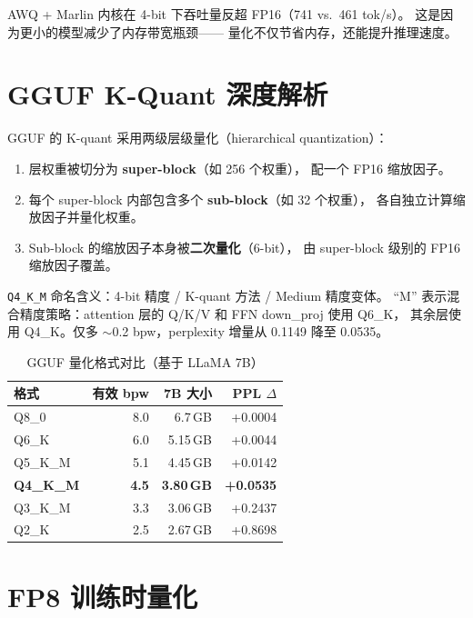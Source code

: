 \documentclass[
  customlatinfont = macos,
]{hkustthesis}
\begin{document}
AWQ + Marlin 内核在 4-bit 下吞吐量反超 FP16（741 vs.\ 461 tok/s）。
这是因为更小的模型减少了内存带宽瓶颈——
量化不仅节省内存，还能提升推理速度。

\section{GGUF K-Quant 深度解析}

GGUF 的 K-quant 采用两级层级量化（hierarchical quantization）：

\begin{enumerate}[noitemsep]
  \item 层权重被切分为 \textbf{super-block}（如 256 个权重），
        配一个 FP16 缩放因子。
  \item 每个 super-block 内部包含多个 \textbf{sub-block}（如 32 个权重），
        各自独立计算缩放因子并量化权重。
  \item Sub-block 的缩放因子本身被\textbf{二次量化}（6-bit），
        由 super-block 级别的 FP16 缩放因子覆盖。
\end{enumerate}

\texttt{Q4\_K\_M} 命名含义：4-bit 精度 / K-quant 方法 / Medium 精度变体。
``M'' 表示混合精度策略：attention 层的 Q/K/V 和 FFN down\_proj 使用 Q6\_K，
其余层使用 Q4\_K。仅多 $\sim$0.2 bpw，perplexity 增量从 0.1149 降至 0.0535。

\begin{table}[H]
\centering\small
\caption{GGUF 量化格式对比（基于 LLaMA 7B）}
\label{tab:gguf}
\begin{tabularx}{\linewidth}{l r r r}
\toprule
\textbf{格式} & \textbf{有效 bpw} & \textbf{7B 大小} & \textbf{PPL $\Delta$} \\
\midrule
Q8\_0 & 8.0 & 6.7\,GB & +0.0004 \\
Q6\_K & 6.0 & 5.15\,GB & +0.0044 \\
Q5\_K\_M & 5.1 & 4.45\,GB & +0.0142 \\
\rowcolor{quantBg}
\textbf{Q4\_K\_M} & \textbf{4.5} & \textbf{3.80\,GB} & \textbf{+0.0535} \\
Q3\_K\_M & 3.3 & 3.06\,GB & +0.2437 \\
Q2\_K & 2.5 & 2.67\,GB & +0.8698 \\
\bottomrule
\end{tabularx}
\end{table}

\section{FP8 训练时量化}
\end{document}
